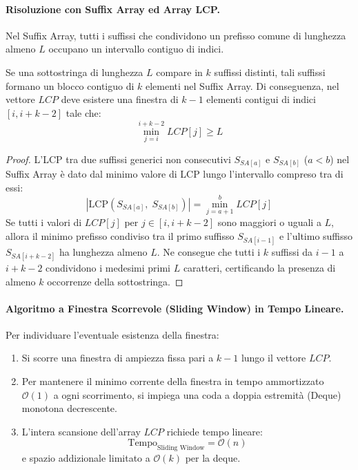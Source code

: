 \paragraph{Risoluzione con Suffix Array ed Array LCP.}
Nel Suffix Array, tutti i suffissi che condividono un prefisso comune di lunghezza almeno $L$ occupano un intervallo contiguo di indici.

\begin{theorem}
Se una sottostringa di lunghezza $L$ compare in $k$ suffissi distinti, tali suffissi formano un blocco contiguo di $k$ elementi nel Suffix Array. Di conseguenza, nel vettore $LCP$ deve esistere una finestra di $k - 1$ elementi contigui di indici $[i, i + k - 2]$ tale che:
\begin{equation}
  \min_{j = i}^{i + k - 2} LCP[j] \ge L
\end{equation}
\end{theorem}

\begin{proof}
L'LCP tra due suffissi generici non consecutivi $S_{SA[a]}$ e $S_{SA[b]}$ ($a < b$) nel Suffix Array \`e dato dal minimo valore di LCP lungo l'intervallo compreso tra di essi:
\begin{equation}
  |\text{LCP}(S_{SA[a]}, \; S_{SA[b]})| = \min_{j = a + 1}^b LCP[j]
\end{equation}
Se tutti i valori di $LCP[j]$ per $j \in [i, i + k - 2]$ sono maggiori o uguali a $L$, allora il minimo prefisso condiviso tra il primo suffisso $S_{SA[i-1]}$ e l'ultimo suffisso $S_{SA[i + k - 2]}$ ha lunghezza almeno $L$. Ne consegue che tutti i $k$ suffissi da $i - 1$ a $i + k - 2$ condividono i medesimi primi $L$ caratteri, certificando la presenza di almeno $k$ occorrenze della sottostringa.
\end{proof}

\paragraph{Algoritmo a Finestra Scorrevole (Sliding Window) in Tempo Lineare.}
Per individuare l'eventuale esistenza della finestra:
\begin{enumerate}
  \item Si scorre una finestra di ampiezza fissa pari a $k - 1$ lungo il vettore $LCP$.
  \item Per mantenere il minimo corrente della finestra in tempo ammortizzato $\mathcal{O}(1)$ a ogni scorrimento, si impiega una coda a doppia estremit\`a (Deque) monotona decrescente.
  \item L'intera scansione dell'array $LCP$ richiede tempo lineare:
  \begin{equation}
    \text{Tempo}_{\text{Sliding Window}} = \mathcal{O}(n)
  \end{equation}
  e spazio addizionale limitato a $\mathcal{O}(k)$ per la deque.
\end{enumerate}

